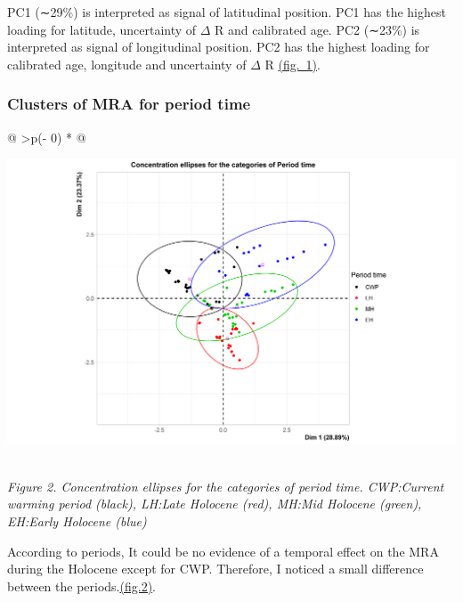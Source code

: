 \documentclass[
]{article}
\begin{document}
PC1 (∼29\%) is interpreted as signal of latitudinal position. PC1 has
the highest loading for latitude, uncertainty of \(\Delta\) R and
calibrated age. PC2 (∼23\%) is interpreted as signal of longitudinal
position. PC2 has the highest loading for calibrated age, longitude and
uncertainty of \(\Delta\) R
\protect\hyperlink{principal-component-analysis-ux28pcaux29}{(fig.~1)}.

\hypertarget{clusters-of-mra-for-period-time}{%
\subsubsection{Clusters of MRA for period
time}\label{clusters-of-mra-for-period-time}}

\begin{longtable}[]{@{}
  >{\centering\arraybackslash}p{(\columnwidth - 0\tabcolsep) * }@{}}
\toprule
\begin{minipage}[b]{\linewidth}\centering
\href{https://github.com/jasb3110/Radiocarbon-reservoir/blob/db842ff0620d55ea5ca5ceec0d96a369406b6e3c/plotellipses.period.png?raw=true}{\includegraphics{plotellipses.period.png}}
\end{minipage} \\
\midrule
\endhead
\emph{Figure 2. Concentration ellipses for the categories of period
time. CWP:Current warming period (black), LH:Late Holocene (red), MH:Mid
Holocene (green), EH:Early Holocene (blue)} \\
\bottomrule
\end{longtable}

According to periods, It could be no evidence of a temporal effect on
the MRA during the Holocene except for CWP. Therefore, I noticed a small
difference between the
periods.\protect\hyperlink{Clusters-of-mra-for-period-time}{(fig.2)}.
\end{document}
